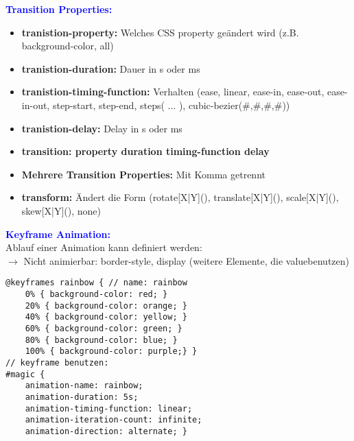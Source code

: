 \textbf{\textcolor{blue}{Transition Properties:}}
\begin{itemize}[topsep=0pt, leftmargin=3mm]
    \setlength\itemsep{-0.3em}
    \item \textbf{tranistion-property:} Welches CSS property geändert wird (z.B. background-color, all)
    \item \textbf{tranistion-duration:} Dauer in s oder ms
    \item \textbf{tranistion-timing-function:} Verhalten (ease, linear, ease-in, ease-out, ease-in-out, step-start, step-end, steps( ... ), cubic-bezier(\#,\#,\#,\#))
    \item \textbf{tranistion-delay:} Delay in s oder ms
    \item \textbf{transition: property duration timing-function delay}
    \item \textbf{Mehrere Transition Properties:} Mit Komma getrennt
    \item \textbf{transform:} Ändert die Form (rotate[X|Y](), translate[X|Y](), scale[X|Y](), skew[X|Y](), none)
\end{itemize}
\textbf{\textcolor{blue}{Keyframe Animation:}}\\
Ablauf einer Animation kann definiert werden:\\
$\rightarrow$ Nicht animierbar: border-style, display (weitere Elemente, die \dq value\dq benutzen)
\begin{lstlisting}[style=htmlcssjs]
@keyframes rainbow { // name: rainbow
    0% { background-color: red; }
    20% { background-color: orange; }
    40% { background-color: yellow; }
    60% { background-color: green; }
    80% { background-color: blue; }
    100% { background-color: purple;} }
// keyframe benutzen:
#magic {
    animation-name: rainbow;
    animation-duration: 5s;
    animation-timing-function: linear;
    animation-iteration-count: infinite;
    animation-direction: alternate; }
\end{lstlisting}
